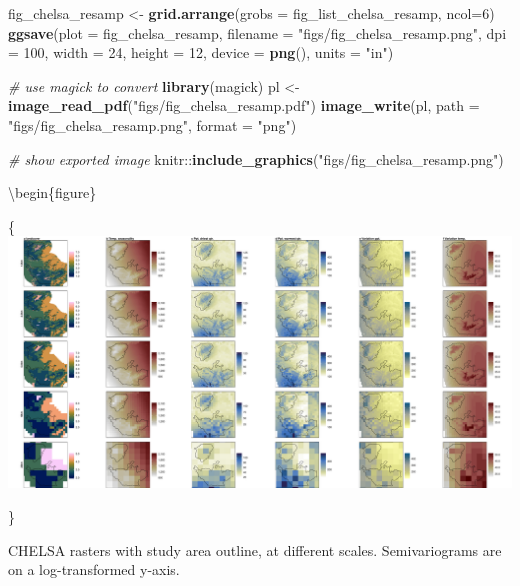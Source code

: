 \documentclass[]{article}
\newenvironment{Shaded}{}{}
\newcommand{\CommentTok}[1]{\textcolor[rgb]{0.38,0.63,0.69}{\textit{#1}}}
\newcommand{\DataTypeTok}[1]{\textcolor[rgb]{0.56,0.13,0.00}{#1}}
\newcommand{\DecValTok}[1]{\textcolor[rgb]{0.25,0.63,0.44}{#1}}
\newcommand{\KeywordTok}[1]{\textcolor[rgb]{0.00,0.44,0.13}{\textbf{#1}}}
\newcommand{\NormalTok}[1]{#1}
\newcommand{\OperatorTok}[1]{\textcolor[rgb]{0.40,0.40,0.40}{#1}}
\newcommand{\StringTok}[1]{\textcolor[rgb]{0.25,0.44,0.63}{#1}}
\begin{document}
\begin{Shaded}
\begin{Highlighting}[]
\NormalTok{fig_chelsa_resamp <-}\StringTok{ }\KeywordTok{grid.arrange}\NormalTok{(}\DataTypeTok{grobs =}\NormalTok{ fig_list_chelsa_resamp, }\DataTypeTok{ncol=}\DecValTok{6}\NormalTok{)}
\KeywordTok{ggsave}\NormalTok{(}\DataTypeTok{plot =}\NormalTok{ fig_chelsa_resamp, }\DataTypeTok{filename =} \StringTok{"figs/fig_chelsa_resamp.png"}\NormalTok{, }\DataTypeTok{dpi =} \DecValTok{100}\NormalTok{, }\DataTypeTok{width =} \DecValTok{24}\NormalTok{, }\DataTypeTok{height =} \DecValTok{12}\NormalTok{, }\DataTypeTok{device =} \KeywordTok{png}\NormalTok{(), }\DataTypeTok{units =} \StringTok{"in"}\NormalTok{)}

\CommentTok{# use magick to convert}
\KeywordTok{library}\NormalTok{(magick)}
\NormalTok{pl <-}\StringTok{ }\KeywordTok{image_read_pdf}\NormalTok{(}\StringTok{"figs/fig_chelsa_resamp.pdf"}\NormalTok{)}
\KeywordTok{image_write}\NormalTok{(pl, }\DataTypeTok{path =} \StringTok{"figs/fig_chelsa_resamp.png"}\NormalTok{, }\DataTypeTok{format =} \StringTok{"png"}\NormalTok{)}
\end{Highlighting}
\end{Shaded}

\begin{Shaded}
\begin{Highlighting}[]

\CommentTok{# show exported image}
\NormalTok{knitr}\OperatorTok{::}\KeywordTok{include_graphics}\NormalTok{(}\StringTok{"figs/fig_chelsa_resamp.png"}\NormalTok{)}
\end{Highlighting}
\end{Shaded}

\textbackslash{}begin\{figure\}

\{\centering \includegraphics[width=\textwidth]{figs/fig_chelsa_resamp}

\}

\caption{CHELSA rasters with study area outline, at different scales. Semivariograms are on a log-transformed y-axis.}
\end{document}
